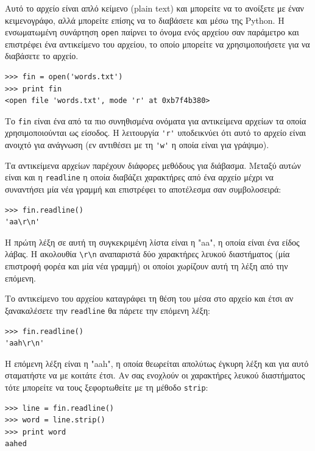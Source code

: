 \documentclass[10pt]{book}
\begin{document}
Αυτό το αρχείο είναι απλό κείμενο (plain text) και μπορείτε να το ανοίξετε με έναν κειμενογράφο, αλλά μπορείτε επίσης να το διαβάσετε και μέσω της Python.  Η ενσωματωμένη συνάρτηση {\tt open} παίρνει το όνομα ενός αρχείου σαν παράμετρο και επιστρέφει ένα αντικείμενο του αρχείου, το οποίο μπορείτε να χρησιμοποιήσετε για να διαβάσετε το αρχείο. 

\begin{verbatim}
>>> fin = open('words.txt')
>>> print fin
<open file 'words.txt', mode 'r' at 0xb7f4b380>
\end{verbatim}
%

Το {\tt fin} είναι ένα από τα πιο συνηθισμένα ονόματα για αντικείμενα αρχείων τα οποία χρησιμοποιούνται ως είσοδος. Η λειτουργία \verb"'r'" υποδεικνύει ότι αυτό το αρχείο είναι ανοιχτό για ανάγνωση (εν αντιθέσει με τη \verb"'w'" η οποία είναι για γράψιμο).


Τα αντικείμενα αρχείων παρέχουν διάφορες μεθόδους για διάβασμα. Μεταξύ αυτών είναι και η {\tt readline} η οποία διαβάζει χαρακτήρες από ένα αρχείο μέχρι να συναντήσει μία νέα γραμμή και επιστρέφει το αποτέλεσμα σαν συμβολοσειρά:

\begin{verbatim}
>>> fin.readline()
'aa\r\n'
\end{verbatim}
%

Η πρώτη λέξη σε αυτή τη συγκεκριμένη λίστα είναι η "aa", η οποία είναι ένα είδος λάβας. Η ακολουθία \verb"\r\n" αναπαριστά δύο χαρακτήρες λευκού διαστήματος (μία επιστροφή φορέα και μία νέα γραμμή) οι οποίοι χωρίζουν αυτή τη λέξη από την επόμενη.

Το αντικείμενο του αρχείου καταγράφει τη θέση του μέσα στο αρχείο και έτσι αν ξανακαλέσετε την {\tt readline} θα πάρετε την επόμενη λέξη:

\begin{verbatim}
>>> fin.readline()
'aah\r\n'
\end{verbatim}
%

Η επόμενη λέξη είναι η "aah", η οποία θεωρείται απολύτως έγκυρη λέξη και για αυτό σταματήστε να με κοιτάτε έτσι. Αν σας ενοχλούν οι χαρακτήρες λευκού  διαστήματος τότε μπορείτε να τους ξεφορτωθείτε με τη μέθοδο {\tt strip}:

\begin{verbatim}
>>> line = fin.readline()
>>> word = line.strip()
>>> print word
aahed
\end{verbatim}
%
\end{document}
